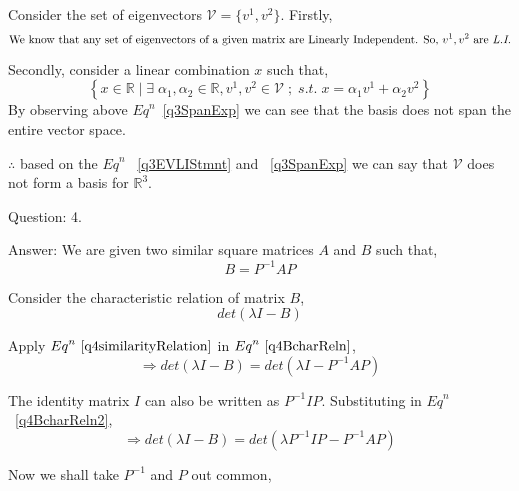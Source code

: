 \documentclass[a4paper]{article}
\begin{document}
\begin{qalist}
			Consider the set of eigenvectors $\mathcal{V} = \{{v}^{1}, {v}^{2}\}$. Firstly,
			\begin{equation} \label{q3EVLIStmnt}
				\text{We know that any set of eigenvectors of a given matrix are Linearly Independent. So, ${v}^{1}, {v}^{2}$ are \textit{L.I.}}
			\end{equation}
			
			Secondly, consider a linear combination $x$ such that, 
			\begin{equation}\label{q3SpanExp}
				\left\{x\in\mathbb{R}\;|\;\exists \; {\alpha}_{1}, {\alpha}_{2} \in \mathbb{R}, {v}^{1}, {v}^{2} \in \mathcal{V} \;;\;s.t.\;x = {\alpha}_{1}{v}^{1} + {\alpha}_{2}{v}^{2}\right\}
			\end{equation}
			By observing above ${Eq}^{n}$~\ref{q3SpanExp} we can see that the basis does not span the entire vector space.
			
			$\therefore$ based on the ${Eq}^{n}$ ~\ref{q3EVLIStmnt} and ~\ref{q3SpanExp} we can say that $\mathcal{V}$ does not form a basis for ${\mathbb{R}}^{3}$.

		\newpage
		\item[Question: 4.] \setcounter{equation}{0} 
		\item[Answer:] We are given two similar square matrices $A$ and $B$ such that,
			\begin{equation}\label{q4similarityRelation}B = {P}^{-1} A P\end{equation}
			
			Consider the characteristic relation of matrix $B$, 
			\begin{equation}\label{q4BcharReln1} det(\lambda I - B) \end{equation}
			
			Apply ${Eq}^{n}~\ref{q4similarityRelation}$ in ${Eq}^{n}~\ref{q4BcharReln}$, 
			\begin{equation}\label{q4BcharReln2}
				\Rightarrow  det(\lambda I - B) =  det(\lambda I - {P}^{-1} A P) 
			\end{equation}
			
			The identity matrix $I$ can also be written as ${P}^{-1} I P$. Substituting in ${Eq}^{n}$ ~\ref{q4BcharReln2}, 
			\begin{equation}\label{q4BcharReln3}
				\Rightarrow  det(\lambda I - B) =  det(\lambda {P}^{-1} I P - {P}^{-1} A P) 
			\end{equation}
			
			Now we shall take ${P}^{-1}$ and $P$ out common, 
			

\end{qalist}
\end{document}
